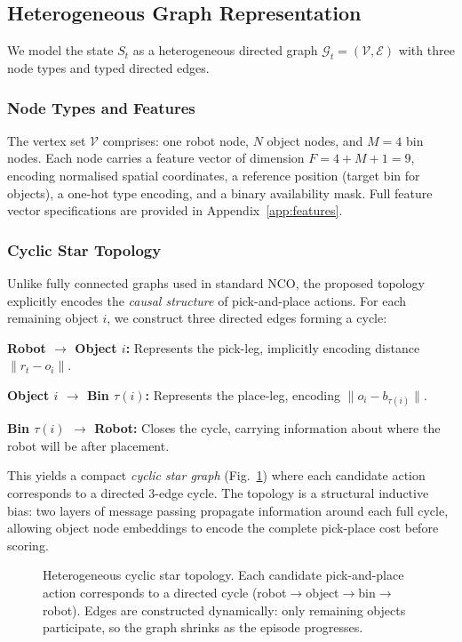 \documentclass[conference]{IEEEtran}
\begin{document}
\subsection{Heterogeneous Graph Representation}

We model the state $S_t$ as a heterogeneous directed graph $\mathcal{G}_t = (\mathcal{V}, \mathcal{E})$ with three node types and typed directed edges.

\subsubsection{Node Types and Features}
The vertex set $\mathcal{V}$ comprises: one robot node, $N$ object nodes, and $M{=}4$ bin nodes. Each node carries a feature vector of dimension $F = 4 + M + 1 = 9$, encoding normalised spatial coordinates, a reference position (target bin for objects), a one-hot type encoding, and a binary availability mask. Full feature vector specifications are provided in Appendix~\ref{app:features}.

\subsubsection{Cyclic Star Topology}\label{sec:topology}
Unlike fully connected graphs used in standard NCO, the proposed topology explicitly encodes the \emph{causal structure} of pick-and-place actions. For each remaining object $i$, we construct three directed edges forming a cycle:

\textbf{Robot $\to$ Object $i$:} Represents the pick-leg, implicitly encoding distance $\lVert r_t - o_i \rVert$.

\textbf{Object $i$ $\to$ Bin $\tau(i)$:} Represents the place-leg, encoding $\lVert o_i - b_{\tau(i)} \rVert$.

\textbf{Bin $\tau(i)$ $\to$ Robot:} Closes the cycle, carrying information about where the robot will be after placement.

This yields a compact \emph{cyclic star graph} (Fig.~\ref{fig:graph_topology}) where each candidate action corresponds to a directed 3-edge cycle. The topology is a structural inductive bias: two layers of message passing propagate information around each full cycle, allowing object node embeddings to encode the complete pick-place cost before scoring.


\begin{figure}[htbp]
\centering
{}
\caption{Heterogeneous cyclic star topology. Each candidate pick-and-place action corresponds to a directed cycle (robot$\to$object$\to$bin$\to$robot). Edges are constructed dynamically: only remaining objects participate, so the graph shrinks as the episode progresses.}
\label{fig:graph_topology}
\end{figure}
\end{document}

